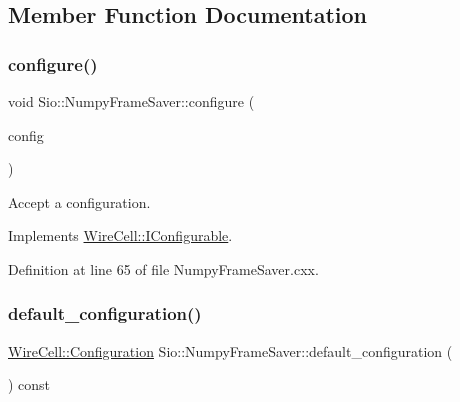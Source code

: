 \subsection{Member Function Documentation}
\mbox{\label{class_wire_cell_1_1_sio_1_1_numpy_frame_saver_a19410b5b0a435a8269e2fa5e27127016}} 
\subsubsection{\texorpdfstring{configure()}{configure()}}
{\footnotesize\ttfamily void Sio\+::\+Numpy\+Frame\+Saver\+::configure (\begin{DoxyParamCaption}\item[{const \hyperlink{namespace_wire_cell_a9f705541fc1d46c608b3d32c182333ee}{Wire\+Cell\+::\+Configuration} \&}]{config }\end{DoxyParamCaption})\hspace{0.3cm}{\ttfamily [virtual]}}



Accept a configuration. 



Implements \hyperlink{class_wire_cell_1_1_i_configurable_a57ff687923a724093df3de59c6ff237d}{Wire\+Cell\+::\+I\+Configurable}.



Definition at line 65 of file Numpy\+Frame\+Saver.\+cxx.

\mbox{\label{class_wire_cell_1_1_sio_1_1_numpy_frame_saver_ab6125a2331cd69cd1f4a8d071114f5be}} 
\subsubsection{\texorpdfstring{default\+\_\+configuration()}{default\_configuration()}}
{\footnotesize\ttfamily \hyperlink{namespace_wire_cell_a9f705541fc1d46c608b3d32c182333ee}{Wire\+Cell\+::\+Configuration} Sio\+::\+Numpy\+Frame\+Saver\+::default\+\_\+configuration (\begin{DoxyParamCaption}{ }\end{DoxyParamCaption}) const\hspace{0.3cm}{\ttfamily [virtual]}}



